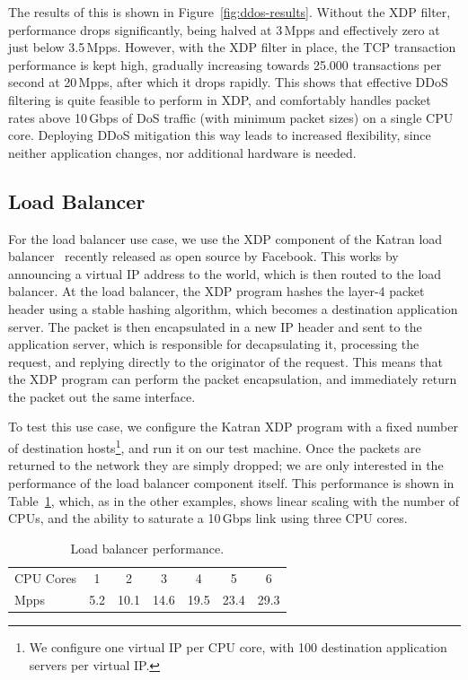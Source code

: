 \documentclass[10pt,sigconf]{acmart}
\begin{document}
The results of this is shown in Figure~\ref{fig:ddos-results}. Without the XDP
filter, performance drops significantly, being halved at 3\,Mpps and effectively
zero at just below 3.5\,Mpps. However, with the XDP filter in place, the TCP
transaction performance is kept high, gradually increasing towards 25.000
transactions per second at 20\,Mpps, after which it drops rapidly. This shows
that effective DDoS filtering is quite feasible to perform in XDP, and
comfortably handles packet rates above 10\,Gbps of DoS traffic (with minimum
packet sizes) on a single CPU core. Deploying DDoS mitigation this way leads to
increased flexibility, since neither application changes, nor additional
hardware is needed.

\subsection{Load Balancer}
\label{sec:load-balancer}
For the load balancer use case, we use the XDP component of the Katran load
balancer~\cite{katran} recently released as open source by Facebook. This works
by announcing a virtual IP address to the world, which is then routed to the
load balancer. At the load balancer, the XDP program hashes the layer-4 packet
header using a stable hashing algorithm, which becomes a destination application
server. The packet is then encapsulated in a new IP header and sent to the
application server, which is responsible for decapsulating it, processing the
request, and replying directly to the originator of the request. This means that
the XDP program can perform the packet encapsulation, and immediately return the
packet out the same interface.

To test this use case, we configure the Katran XDP program with a fixed number
of destination hosts\footnote{We configure one virtual IP per CPU core, with 100
  destination application servers per virtual IP.}, and run it on our test
machine. Once the packets are returned to the network they are simply dropped;
we are only interested in the performance of the load balancer component itself.
This performance is shown in Table~\ref{tbl:load-balancer}, which, as in the
other examples, shows linear scaling with the number of CPUs, and the ability to
saturate a 10\,Gbps link using three CPU cores.

\begin{table}[htbp]
\caption{\label{tbl:load-balancer}Load balancer performance.}
\centering
\begin{tabular}{lcccccc}
  \toprule
  CPU Cores & 1   &  2  &  3  &  4  &  5  &  6  \\
  Mpps & 5.2 & 10.1 & 14.6 & 19.5 & 23.4 & 29.3 \\
\bottomrule
\end{tabular}
\end{table}
\end{document}
